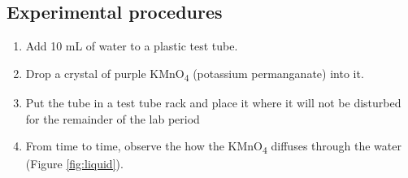 \documentclass[]{book}
\providecommand{\tightlist}{%
  \setlength{\itemsep}{0pt}\setlength{\parskip}{0pt}}
\theoremstyle{definition}
\theoremstyle{definition}
\theoremstyle{definition}
\theoremstyle{remark}
\begin{document}
\subsection{Experimental procedures}\label{experimental-procedures-14}

\begin{enumerate}
\def\labelenumi{\arabic{enumi}.}
\tightlist
\item
  Add 10 mL of water to a plastic test tube.
\item
  Drop a crystal of purple KMnO\textsubscript{4} (potassium
  permanganate) into it.
\item
  Put the tube in a test tube rack and place it where it will not be
  disturbed for the remainder of the lab period
\item
  From time to time, observe the how the KMnO\textsubscript{4} diffuses
  through the water (Figure \ref{fig:liquid}).
\end{enumerate}
\end{document}
